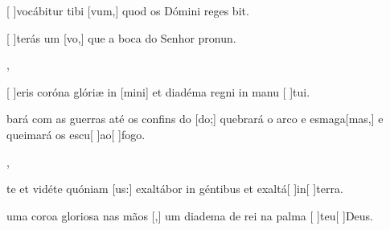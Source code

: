 {  %
  {\item {}[ ]{vo}cábitur tibi [vum,] quod os Dómini reges bit.~\Antiphona}%
    {\item {}[ ]{te}rás um [vo,] que a boca do Senhor pronun.~\Antiphona},
  {\item {}[ ]{e}ris coróna glóriæ in [mini] et diadéma regni in manu [ ]{tu}i.~\Antiphona}%
    {\item {}bará com as guerras até os confins do [do;] quebrará o arco e esmaga[mas,] e queimará os escu[ ]{ao}[ ]{fo}go.~\Antiphona},
  {\item {}te et vidéte quóniam [us:] exaltábor in géntibus et exaltá[ ]{in}[ ]{ter}ra.~\Antiphona}%
    {\item {} uma coroa gloriosa nas mãos [,] um diadema de rei na palma [ ]{teu}[ ]{Deus}.~\Antiphona}
}